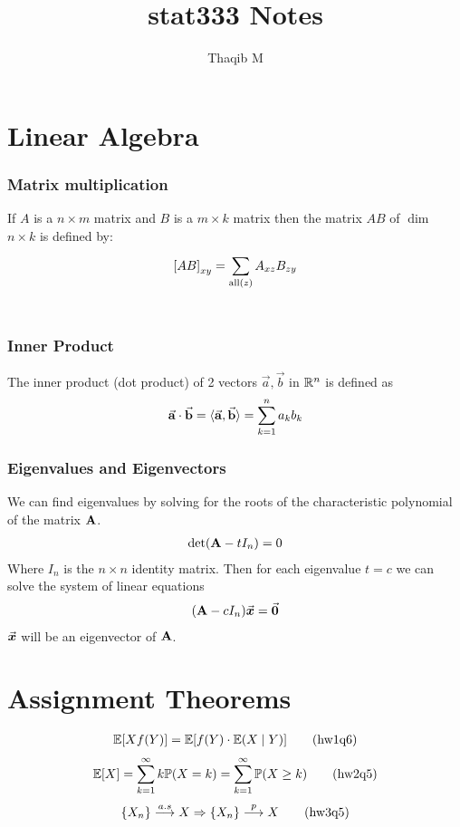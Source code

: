 \documentclass[12pt,a4paper]{article}
\author{Thaqib M}
\title{stat333 Notes}
\begin{document}
\maketitle
\newpage
\section*{Linear Algebra}
\subsubsection*{Matrix multiplication} If $A$ is a $n\times m$ matrix and $B$ is a $m\times k$ matrix then the matrix $AB$ of $\dim$ $n\times k$ is defined by: 
\begin{align*}
{\bf[}AB{\bf]}_{xy} = \sum\limits_{\mathrm{all}(z)}^{}A_{xz}B_{zy}
\end{align*}
\\
\subsubsection*{Inner Product} The inner product (dot product) of 2 vectors $\vec{a}, \vec{b}$ in $\mathbb{R}^n$ is defined as
\begin{align*}
\va{a}\cdot \va{b} = \langle\va{a},\va{b}\rangle = \sum\limits_{k=1}^{n}a_kb_k
\end{align*}
\subsubsection*{Eigenvalues and Eigenvectors}
We can find eigenvalues by solving for the roots of the characteristic polynomial of the matrix $\vb A$.
\begin{align*}
\det(\vb A-tI_n) = 0
\end{align*}
Where $I_n$ is the $n\times n$ identity matrix.
Then for each eigenvalue $t=c$ we can solve the system of linear equations 
\begin{align*}
(\vb A - cI_n)\va* x = \va* 0
\end{align*}
$\va* x$ will be an eigenvector of $\vb A$. 
\newpage
\section*{Assignment Theorems}
\begin{align*}
\mathbb{E}[Xf(Y)] = \mathbb{E}[f(Y)\cdot\mathbb{E}(X\;\vert\; Y)] \tag{hw1q6}
\end{align*}
\begin{align*}
\mathbb{E}[X] = \sum\limits_{k=1}^{\infty}k\mathbb{P}(X=k) = \sum\limits_{k=1}^{\infty} \mathbb{P}(X\geq k) \tag{hw2q5}
\end{align*}
\begin{align*}
\{X_n\} \overset{a.s}{\longrightarrow} X \Rightarrow \{X_n\}\overset{p}{\longrightarrow} X \tag{hw3q5}
\end{align*}
\newpage
\end{document}
